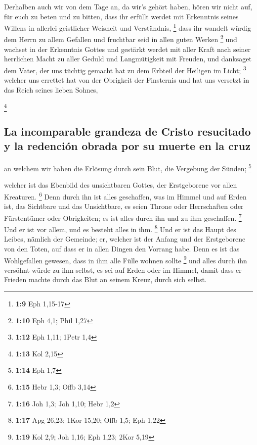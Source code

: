  Derhalben auch wir von dem Tage an, da wir's gehört
haben, hören wir nicht auf, für euch zu beten und zu bitten, dass ihr
erfüllt werdet mit Erkenntnis seines Willens in allerlei geistlicher
Weisheit und Verständnis, \footnote{\textbf{1:9} Eph 1,15-17}
 dass ihr wandelt würdig dem Herrn zu allem Gefallen und
fruchtbar seid in allen guten Werken \footnote{\textbf{1:10} Eph 4,1;
  Phil 1,27}  und wachset in der Erkenntnis Gottes und
gestärkt werdet mit aller Kraft nach seiner herrlichen Macht zu aller
Geduld und Langmütigkeit mit Freuden,  und danksaget dem
Vater, der uns tüchtig gemacht hat zu dem Erbteil der Heiligen im Licht;
\footnote{\textbf{1:12} Eph 1,11; 1Petr 1,4}  welcher uns
errettet hat von der Obrigkeit der Finsternis und hat uns versetzt in
das Reich seines lieben Sohnes,

\footnote{\textbf{1:13} Kol 2,15}

\hypertarget{la-incomparable-grandeza-de-cristo-resucitado-y-la-redenciuxf3n-obrada-por-su-muerte-en-la-cruz}{%
\subsection{La incomparable grandeza de Cristo resucitado y la redención
obrada por su muerte en la
cruz}\label{la-incomparable-grandeza-de-cristo-resucitado-y-la-redenciuxf3n-obrada-por-su-muerte-en-la-cruz}}

 an welchem wir haben die Erlösung durch sein Blut, die
Vergebung der Sünden; \footnote{\textbf{1:14} Eph 1,7}

 welcher ist das Ebenbild des unsichtbaren Gottes, der
Erstgeborene vor allen Kreaturen. \footnote{\textbf{1:15} Hebr 1,3; Offb
  3,14}  Denn durch ihn ist alles geschaffen, was im
Himmel und auf Erden ist, das Sichtbare und das Unsichtbare, es seien
Throne oder Herrschaften oder Fürstentümer oder Obrigkeiten; es ist
alles durch ihn und zu ihm geschaffen. \footnote{\textbf{1:16} Joh 1,3;
  Joh 1,10; Hebr 1,2}  Und er ist vor allem, und es
besteht alles in ihm. \footnote{\textbf{1:17} Apg 26,23; 1Kor 15,20;
  Offb 1,5; Eph 1,22}  Und er ist das Haupt des Leibes,
nämlich der Gemeinde; er, welcher ist der Anfang und der Erstgeborene
von den Toten, auf dass er in allen Dingen den Vorrang habe.
 Denn es ist das Wohlgefallen gewesen, dass in ihm alle
Fülle wohnen sollte \footnote{\textbf{1:19} Kol 2,9; Joh 1,16; Eph 1,23;
  2Kor 5,19}  und alles durch ihn versöhnt würde zu ihm
selbst, es sei auf Erden oder im Himmel, damit dass er Frieden machte
durch das Blut an seinem Kreuz, durch sich selbst.

